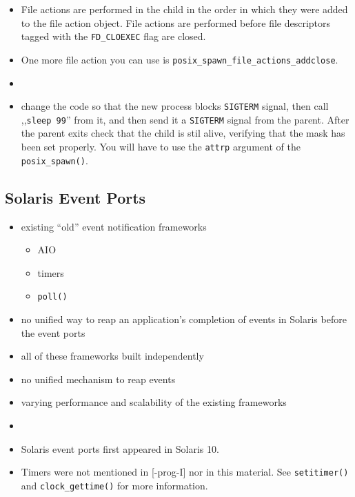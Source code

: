 \begin{itemize}
\item File actions are performed in the child in the order in which they were
added to the file action object. File actions are performed before file
descriptors tagged with the \texttt{FD\_CLOEXEC} flag are closed.
\item One more file action you can use is
\texttt{posix\_spawn\_file\_actions\_addclose}.
\item {}
\item {} change the code so that the new process blocks
\texttt{SIGTERM} signal, then call ,,\texttt{sleep 99}'' from it, and then send
it a \texttt{SIGTERM} signal from the parent. After the parent exits check that
the child is stil alive, verifying that the mask has been set properly. You will
have to use the \texttt{attrp} argument of the \texttt{posix\_spawn()}.
\end{itemize}

\subsection{Solaris Event Ports}

\begin{itemize}
\item existing ``old'' event notification frameworks
	\begin{itemize}
	\item AIO
	\item timers
	\item \texttt{poll()} 
	\end{itemize}
\item no unified way to reap an application's completion of events in Solaris
before the event ports
\item all of these frameworks built independently
\item no unified mechanism to reap events
\item varying performance and scalability of the existing frameworks
\item {}
\end{itemize}


\label{SOLARIS_EVENT_PORTS}

\begin{itemize}
\item Solaris event ports first appeared in Solaris 10.
\item Timers were not mentioned in [\myun\myix-prog-I] nor in this material. See
\texttt{set\-i\-timer()} and \texttt{clock\_gettime()} for more information.
\end{itemize}


